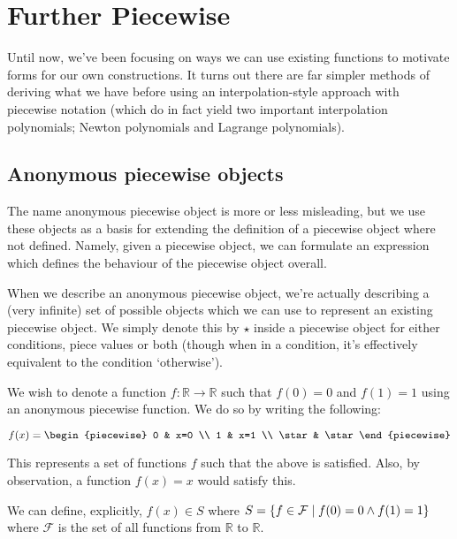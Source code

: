 \section{Further Piecewise}
Until now, we've been focusing on ways we can use existing functions to motivate forms for our own constructions. It turns out there are far simpler methods of deriving what we have before using an interpolation-style approach with piecewise notation (which do in fact yield two important interpolation polynomials; Newton polynomials and Lagrange polynomials).

\subsection{Anonymous piecewise objects}
The name anonymous piecewise object is more or less misleading, but we use these objects as a basis for extending the definition of a piecewise object where not defined. Namely, given a piecewise object, we can formulate an expression which defines the behaviour of the piecewise object overall.

When we describe an anonymous piecewise object, we're actually describing a (very infinite) set of possible objects which we can use to represent an existing piecewise object. We simply denote this by $\star$ inside a piecewise object for either conditions, piece values or both (though when in a condition, it's effectively equivalent to the condition `otherwise').

\begin{example}
    \label{example:anonymous_piecewise_1}
    We wish to denote a function $f:\mathbb{R}\to\mathbb{R}$ such that $f(0)=0$ and $f(1)=1$ using an anonymous piecewise function. We do so by writing the following:

    $$
        f(x) = \begin{piecewise}
            0 & x=0 \\
            1 & x=1 \\
            \star & \star
        \end{piecewise}
    $$

    This represents a set of functions $f$ such that the above is satisfied. Also, by observation, a function $f(x)=x$ would satisfy this.

    We can define, explicitly, $f(x)\in S$ where $S=\br*{f\in \mathcal{F}\mid f(0)=0\land f(1)=1}$ where $\mathcal{F}$ is the set of all functions from $\mathbb{R}$ to $\mathbb{R}$.

\end{example}

